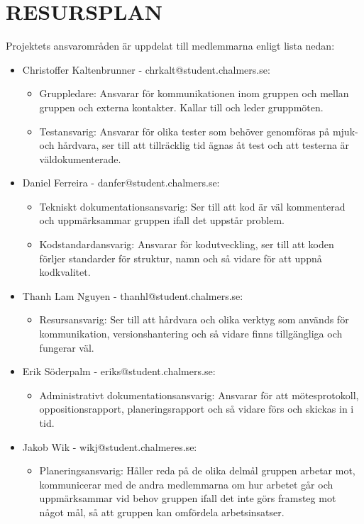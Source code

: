 \documentclass[a4paper]{article}
\begin{document}
\section*{RESURSPLAN}
Projektets ansvarområden är uppdelat till medlemmarna enligt lista nedan: 
\begin{itemize}
\item Christoffer Kaltenbrunner - chrkalt@student.chalmers.se: 
	\begin{itemize}
	\item Gruppledare: Ansvarar för kommunikationen inom gruppen och mellan gruppen och externa kontakter. Kallar till och leder gruppmöten.
	\item Testansvarig: Ansvarar för olika tester som behöver genomföras på mjuk- och hårdvara, ser till att tillräcklig tid ägnas åt test och att testerna är väldokumenterade. 
	\end{itemize}
\item Daniel Ferreira - danfer@student.chalmers.se:
	\begin{itemize}
	\item Tekniskt dokumentationsansvarig: Ser till att kod är väl kommenterad och uppmärksammar gruppen ifall det uppstår problem.
	\item Kodstandardansvarig: Ansvarar för kodutveckling, ser till att koden förljer standarder för struktur, namn och så vidare för att uppnå kodkvalitet.
	\end{itemize}
\item Thanh Lam Nguyen - thanhl@student.chalmers.se: 
	\begin{itemize}
	\item Resursansvarig: Ser till att hårdvara och olika verktyg som används för kommunikation, versionshantering och så vidare finns tillgängliga och fungerar väl.
	\end{itemize}
\item Erik Söderpalm - eriks@student.chalmers.se:
	\begin{itemize}
	\item Administrativt dokumentationsansvarig: Ansvarar för att mötesprotokoll, oppositionsrapport, planeringsrapport och så vidare förs och skickas in i tid. 
	\end{itemize}
\item Jakob Wik - wikj@student.chalmeres.se:
	\begin{itemize}
	\item Planeringsansvarig: Håller reda på de olika delmål gruppen arbetar mot, kommunicerar med de andra medlemmarna om hur arbetet går och uppmärksammar vid behov gruppen ifall det inte görs framsteg mot något mål, så att gruppen kan omfördela arbetsinsatser.
	\end{itemize}
\end{itemize}
\end{document}
